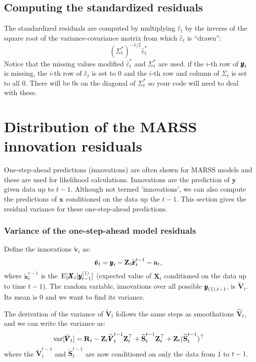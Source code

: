 \documentclass[]{article}
\def\XI{\mbox{\boldmath $\Xi$}}
\def\E{\,\textup{\textrm{E}}}
\def\RR{\mbox{$\mathbf R$}}	 \def\rr{\mbox{$\mathbf r$}} \def\Rb{\mbox{$\mathbf H$}}	\def\Rm{\mathbb{R}}
\def\Ss{\mbox{$\mathbf S$}}
\def\VV{\mbox{$\pmb{V}$}}	\def\vv{\mbox{$\pmb{v}$}}
\def\XX{\mbox{$\pmb{X}$}}	\def\xx{\mbox{$\pmb{x}$}}
\def\ZZ{\mbox{$\mathbf Z$}}	\def\zz{\mbox{$\mathbf z$}}	\def\Zb{\mbox{$\mathbf M$}} \def\Za{\mbox{$\mathbf N$}} \def\Zm{\XI}
\def\var{\,\textup{\textrm{var}}}
\def\hatxtt1{\widetilde{\xx}_t^{t-1}}
\def\hatVtt1{\widetilde{\VV}_t^{t-1}}
\def\hatStt1{\widetilde{\Ss}_t^{t-1}}
\begin{document}
\subsection{Computing the standardized residuals}
The standardized residuals are computed by multiplying $\hat{\varepsilon}_t$ by the inverse of the square root of the variance-covariance matrix from which $\hat{\varepsilon}_t$ is ``drawn'':
\begin{equation}
(\Sigma_t^*)^{-1/2}\hat{\varepsilon}_t^*
\end{equation}
Notice that the missing values modified $\hat{\varepsilon}_t^*$ and $\Sigma_t^*$ are used. if the $i$-th row of $\mbox{$\pmb{y}$}_t$ is missing, the $i$-th row of $\hat{\varepsilon}_t$ is set to 0 and the $i$-th row and column of $\Sigma_t$ is set to all 0.
There will be 0s on the diagonal of $\Sigma_t^*$ so your code will need to deal with these.

\section{Distribution of the MARSS innovation residuals}

One-step-ahead predictions (innovations) are often shown for MARSS models and these are used for likelihood calculations. Innovations are the prediction of $\mathbf{y}$ given data up to $t-1$. Although not termed 'innovations', we can also compute the predictions of $\mathbf{x}$ conditioned on the data up the $t-1$. This section gives the residual variance for these one-step-ahead predictions. 


\subsubsection{Variance of the one-step-ahead model residuals}

Define the innovations $\tilde{\vv}_t$ as:
\begin{equation}\label{eq:vtT}
\tilde{\vv}_t = \yy_t - \ZZ_t\hatxtt1 - \aa_t,
\end{equation}
where $\hatxtt1$ is the $\E[\XX_t|\yy^{(1)}_{t-1}]$ (expected value of $\XX_t$ conditioned on the data up to time $t-1$). The random variable, innovations over all possible $\mbox{$\pmb{y}$}_{(1),t-1}$, is $\tilde{\VV}_t$. Its mean is 0 and we want to find its variance.


The derivation of the variance of $\tilde{\VV}_t$ follows the same steps as smoothations $\hat{\VV}_t$, and we can write the variance as:
\begin{equation}\label{eq:innov.model}
\var[\tilde{\VV}_t] = \RR_t - \ZZ_t \hatVtt1 \ZZ_t^\top + \hatStt1\ZZ_t^\top + \ZZ_t(\hatStt1)^\top
\end{equation}
where the $\hatVtt1$ and $\hatStt1$ are now conditioned on only the data from 1 to $t-1$.
\end{document}
